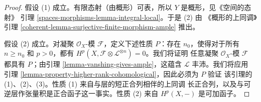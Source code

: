 \begin{proof}
假设 (1) 成立。有限态射（由概形）可表，所以 $Y$ 是概形，见《空间的态射》
引理 \ref{spaces-morphisms-lemma-integral-local}。于是 (2) 由
《概形的上同调》引理
\ref{coherent-lemma-surjective-finite-morphism-ample} 推出。

\medskip\noindent
假设 (2) 成立。对凝聚 $\mathcal{O}_X$-模 $\mathcal{F}$，定义下述性质
$P$：存在 $n_0$，使得对于所有 $n \geq n_0$ 和 $p > 0$，都有
$H^p(X, \mathcal{F} \otimes \mathcal{L}^{\otimes n}) = 0$。我们将证明
任意凝聚 $\mathcal{O}_X$-模 $\mathcal{F}$ 都具有 $P$；由引理
\ref{lemma-vanshing-gives-ample}，这蕴含 $\mathcal{L}$ 丰沛。我们将应用
引理 \ref{lemma-property-higher-rank-cohomological}，因此必须为 $P$ 验证
该引理的 (1)、(2)、(3)。性质 (1) 来自与层的短正合列相伴的上同调
长正合列，以及与可逆层作张量积是正合函子这一事实。性质 (2) 来自
$H^p(X, -)$ 是可加函子。


\end{proof}

